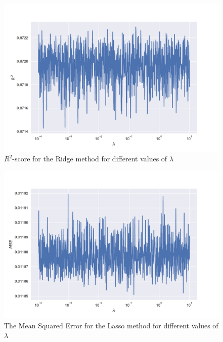 \documentclass[a4paper,10pt,english]{article}
\begin{document}
\begin{figure}[h!]
	\centering 
	\includegraphics[scale=0.6]{../results/part_d_reg_R2.pdf}
	\caption{$R^2$-score for the Ridge method for different values of $\lambda$}
	\label{part_d_R2}
\end{figure}



\begin{figure}[h!]
	\centering 
	\includegraphics[scale=0.6]{../results/part_e_reg_MSE.pdf}
	\caption{The Mean Squared Error for the Lasso method for different values of $\lambda$}
	\label{part_e_MSE}
\end{figure}
\end{document}
